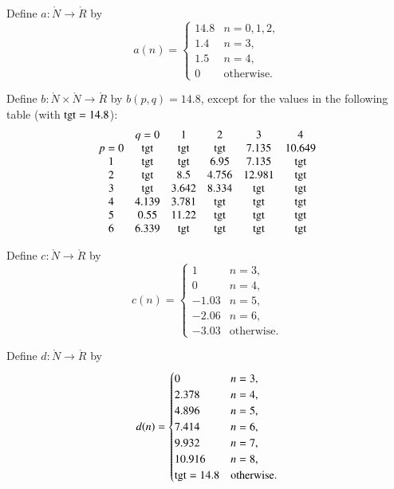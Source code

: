 \begin{definition}
  Define $a:\ring{N}\to \ring{R}$ by
  $$a(n) = \begin{cases}
    14.8 &n=0,1,2,\\
    1.4 & n=3,\\
    1.5 & n=4,\\
    0 & \text{otherwise.}
  \end{cases}
  $$
\end{definition}

\begin{definition}
  Define $b:\ring{N}\times \ring{N}\to \ring{R}$ by $b(p,q)=14.8$,
  except for the values in the following table
  (with  ${\operatorname{tgt}}=14.8$):
  {
  \def\tx{\op{tgt}}
  $$\begin{matrix}  &q=0&1&2&3&4\\
           p=0&\tx&\tx&\tx&7.135&10.649\\
           1&\tx&\tx&6.95&7.135&\tx\\
           2&\tx&8.5&4.756&12.981&\tx\\
           3&\tx&3.642&8.334&\tx&\tx\\
           4&4.139&3.781&\tx&\tx&\tx\\
           5&0.55&11.22&\tx&\tx&\tx\\
           6&6.339&\tx&\tx&\tx&\tx
   \end{matrix}
   $$
   }
\end{definition}

\begin{definition}
  Define $c:\ring{N}\to \ring{R}$ by
  $$c(n) = \begin{cases}
    1 & n=3,\\
    0 & n=4,\\
    -1.03 &n=5,\\
    -2.06 &n=6,\\
    -3.03 &\text{otherwise.}
    \end{cases}
    $$
\end{definition}

\begin{definition}
    Define $d:\ring{N}\to \ring{R}$ by
  $$d(n) = \begin{cases}
    0 & n=3, \\
    2.378 & n=4, \\
    4.896 & n=5, \\
    7.414 & n=6, \\
    9.932 & n=7, \\
    10.916 & n=8,\\
    {\operatorname{tgt}}=14.8 & \text{otherwise}.
  \end{cases}
  $$
\end{definition}

